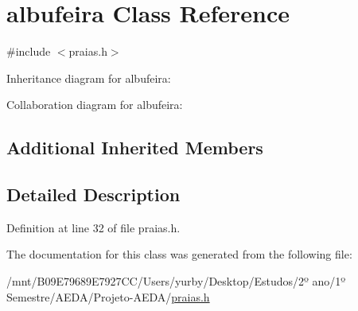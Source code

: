 \hypertarget{classalbufeira}{}\section{albufeira Class Reference}
\label{classalbufeira}


{\ttfamily \#include $<$praias.\+h$>$}



Inheritance diagram for albufeira\+:


Collaboration diagram for albufeira\+:
\subsection*{Additional Inherited Members}


\subsection{Detailed Description}


Definition at line 32 of file praias.\+h.



The documentation for this class was generated from the following file\+:\begin{DoxyCompactItemize}
\item 
/mnt/\+B09\+E79689\+E7927\+C\+C/\+Users/yurby/\+Desktop/\+Estudos/2º ano/1º Semestre/\+A\+E\+D\+A/\+Projeto-\/\+A\+E\+D\+A/\hyperlink{praias_8h}{praias.\+h}\end{DoxyCompactItemize}
